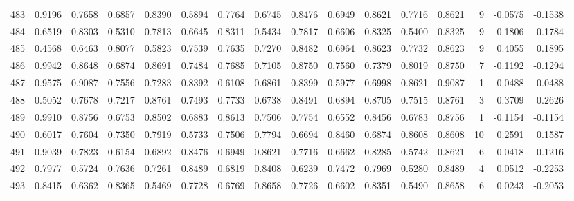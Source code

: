 \begin{tabular}{lrrrrrrrrrrrrrrr}
483 &      0.9196 &  0.7658 &  0.6857 &  0.8390 &  0.5894 &  0.7764 &  0.6745 &  0.8476 &  0.6949 &  0.8621 &   0.7716 &     0.8621 &      9 &                   -0.0575 &                    -0.1538 \\
484 &      0.6519 &  0.8303 &  0.5310 &  0.7813 &  0.6645 &  0.8311 &  0.5434 &  0.7817 &  0.6606 &  0.8325 &   0.5400 &     0.8325 &      9 &                    0.1806 &                     0.1784 \\
485 &      0.4568 &  0.6463 &  0.8077 &  0.5823 &  0.7539 &  0.7635 &  0.7270 &  0.8482 &  0.6964 &  0.8623 &   0.7732 &     0.8623 &      9 &                    0.4055 &                     0.1895 \\
486 &      0.9942 &  0.8648 &  0.6874 &  0.8691 &  0.7484 &  0.7685 &  0.7105 &  0.8750 &  0.7560 &  0.7379 &   0.8019 &     0.8750 &      7 &                   -0.1192 &                    -0.1294 \\
487 &      0.9575 &  0.9087 &  0.7556 &  0.7283 &  0.8392 &  0.6108 &  0.6861 &  0.8399 &  0.5977 &  0.6998 &   0.8621 &     0.9087 &      1 &                   -0.0488 &                    -0.0488 \\
488 &      0.5052 &  0.7678 &  0.7217 &  0.8761 &  0.7493 &  0.7733 &  0.6738 &  0.8491 &  0.6894 &  0.8705 &   0.7515 &     0.8761 &      3 &                    0.3709 &                     0.2626 \\
489 &      0.9910 &  0.8756 &  0.6753 &  0.8502 &  0.6883 &  0.8613 &  0.7506 &  0.7754 &  0.6552 &  0.8456 &   0.6783 &     0.8756 &      1 &                   -0.1154 &                    -0.1154 \\
490 &      0.6017 &  0.7604 &  0.7350 &  0.7919 &  0.5733 &  0.7506 &  0.7794 &  0.6694 &  0.8460 &  0.6874 &   0.8608 &     0.8608 &     10 &                    0.2591 &                     0.1587 \\
491 &      0.9039 &  0.7823 &  0.6154 &  0.6892 &  0.8476 &  0.6949 &  0.8621 &  0.7716 &  0.6662 &  0.8285 &   0.5742 &     0.8621 &      6 &                   -0.0418 &                    -0.1216 \\
492 &      0.7977 &  0.5724 &  0.7636 &  0.7261 &  0.8489 &  0.6819 &  0.8408 &  0.6239 &  0.7472 &  0.7969 &   0.5280 &     0.8489 &      4 &                    0.0512 &                    -0.2253 \\
493 &      0.8415 &  0.6362 &  0.8365 &  0.5469 &  0.7728 &  0.6769 &  0.8658 &  0.7726 &  0.6602 &  0.8351 &   0.5490 &     0.8658 &      6 &                    0.0243 &                    -0.2053 \\

\end{tabular}

